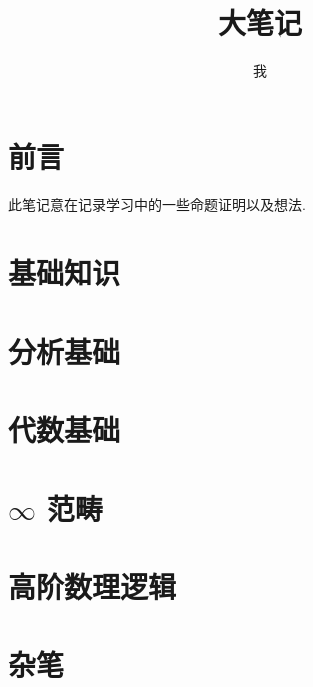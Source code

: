 \documentclass{BigNote}
\title{大笔记}
\author{我}
\begin{document}
    \maketitle

    \tableofcontents
    \newpage

    \chapter*{前言}
    
    此笔记意在记录学习中的一些命题证明以及想法.

    \chapter{基础知识}
    
    
    
    
    
    
    

    \chapter{分析基础}
    
    
    

    \chapter{代数基础}
    
    
    
    
    \chapter{\(\infty\) 范畴}
    

    \chapter{高阶数理逻辑}
    

    \chapter{杂笔}
    




    \printbibliography[heading=bibintoc]
\end{document}
